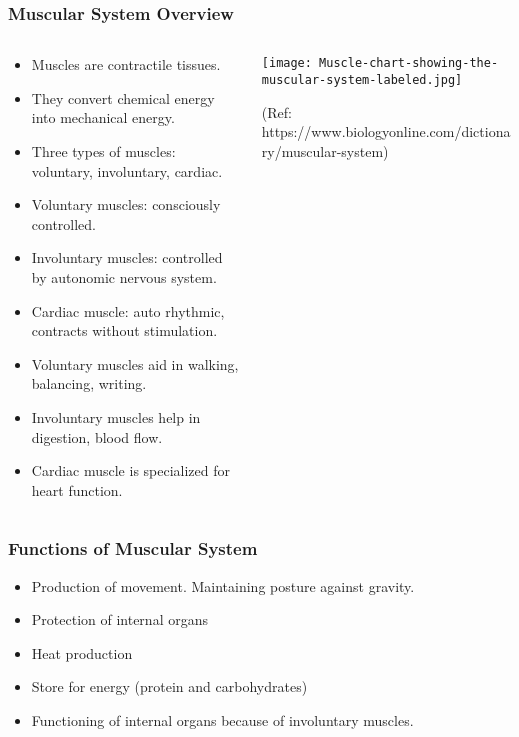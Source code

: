 \begin{frame}[fragile]\frametitle{Muscular System Overview}
\begin{columns}
    \begin{column}[T]{0.5\linewidth}
      \begin{itemize}
		\item Muscles are contractile tissues.
		\item They convert chemical energy into mechanical energy.
		\item Three types of muscles: voluntary, involuntary, cardiac.
		\item Voluntary muscles: consciously controlled.
		\item Involuntary muscles: controlled by autonomic nervous system.
		\item Cardiac muscle: auto rhythmic, contracts without stimulation.
		\item Voluntary muscles aid in walking, balancing, writing.
		\item Involuntary muscles help in digestion, blood flow.
		\item Cardiac muscle is specialized for heart function.
	  \end{itemize}
    \end{column}
    \begin{column}[T]{0.5\linewidth}
		\begin{center}
		\texttt{[image: Muscle-chart-showing-the-muscular-system-labeled.jpg]}
						
		{\tiny (Ref: https://www.biologyonline.com/dictionary/muscular-system)}			
		\end{center}	
    \end{column}
  \end{columns}
\end{frame}


\begin{frame}[fragile]\frametitle{Functions of Muscular System }

      \begin{itemize}
		\item Production of movement. Maintaining posture against gravity.
		\item Protection of internal organs
		\item Heat production
		\item Store for energy (protein and carbohydrates)
		\item Functioning of internal organs because of involuntary muscles.
	  \end{itemize}

\end{frame}

